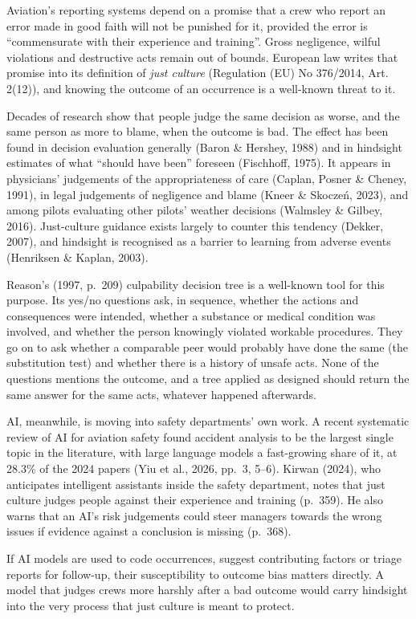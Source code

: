\documentclass{aer}
\begin{document}
Aviation's reporting systems depend on a promise that a crew who report an error made in good faith will not be punished for it, provided the error is ``commensurate with their experience and training''. Gross negligence, wilful violations and destructive acts remain out of bounds. European law writes that promise into its definition of \emph{just culture} (Regulation (EU) No 376/2014, Art. 2(12)), and knowing the outcome of an occurrence is a well-known threat to it.

Decades of research show that people judge the same decision as worse, and the same person as more to blame, when the outcome is bad. The effect has been found in decision evaluation generally (Baron \& Hershey, 1988) and in hindsight estimates of what ``should have been'' foreseen (Fischhoff, 1975). It appears in physicians' judgements of the appropriateness of care (Caplan, Posner \& Cheney, 1991), in legal judgements of negligence and blame (Kneer \& Skoczeń, 2023), and among pilots evaluating other pilots' weather decisions (Walmsley \& Gilbey, 2016). Just-culture guidance exists largely to counter this tendency (Dekker, 2007), and hindsight is recognised as a barrier to learning from adverse events (Henriksen \& Kaplan, 2003).

Reason's (1997, p.~209) culpability decision tree is a well-known tool for this purpose. Its yes/no questions ask, in sequence, whether the actions and consequences were intended, whether a substance or medical condition was involved, and whether the person knowingly violated workable procedures. They go on to ask whether a comparable peer would probably have done the same (the substitution test) and whether there is a history of unsafe acts. None of the questions mentions the outcome, and a tree applied as designed should return the same answer for the same acts, whatever happened afterwards.

AI, meanwhile, is moving into safety departments' own work. A recent systematic review of AI for aviation safety found accident analysis to be the largest single topic in the literature, with large language models a fast-growing share of it, at 28.3\% of the 2024 papers (Yiu et al., 2026, pp.~3, 5--6). Kirwan (2024), who anticipates intelligent assistants inside the safety department, notes that just culture judges people against their experience and training (p.~359). He also warns that an AI's risk judgements could steer managers towards the wrong issues if evidence against a conclusion is missing (p.~368).

If AI models are used to code occurrences, suggest contributing factors or triage reports for follow-up, their susceptibility to outcome bias matters directly. A model that judges crews more harshly after a bad outcome would carry hindsight into the very process that just culture is meant to protect.
\end{document}
